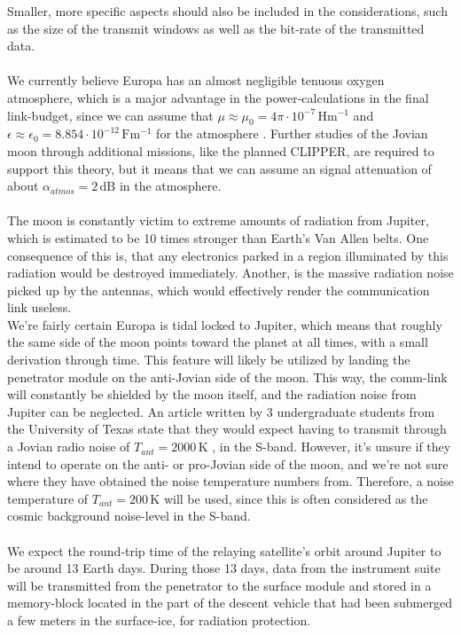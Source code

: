 Smaller, more specific aspects should also be included in the considerations, such as the size of the transmit windows as well as the bit-rate of the transmitted data.\\
\\
We currently believe Europa has an almost negligible tenuous oxygen atmosphere, which is a major advantage in the power-calculations in the final link-budget, since we can assume that $\mu\approx\mu_0=4\pi\cdot 10^{-7}\,\mathrm{Hm^{-1}}$ and $\epsilon\approx\epsilon_0=8.854\cdot 10^{-12} \,\mathrm{Fm^{-1}}$ for the atmosphere \cite{SciStrat}. Further studies of the Jovian moon through additional missions, like the planned CLIPPER, are required to support this theory, but it means that we can assume an signal attenuation of about $\alpha_{atmos}=2\,\mathrm{dB}$ in the atmosphere.\\
\\
The moon is constantly victim to extreme amounts of radiation from Jupiter, which is estimated to be 10 times stronger than Earth's Van Allen belts. One consequence of this is, that any electronics parked in a region illuminated by this radiation would be destroyed immediately. Another, is the massive radiation noise picked up by the antennas, which would effectively render the communication link useless.\\ 
We're fairly certain Europa is tidal locked to Jupiter, which means that roughly the same side of the moon points toward the planet at all times, with a small derivation through time. This feature will likely be utilized by landing the penetrator module on the anti-Jovian side of the moon. This way, the comm-link will constantly be shielded by the moon itself, and the radiation noise from Jupiter can be neglected. An article written by 3 undergraduate students from the University of Texas state that they would expect having to transmit through a Jovian radio noise of $T_{ant}=2000\,\mathrm{K}$ \cite{DORRA}, in the S-band. However, it's unsure if they intend to operate on the anti- or pro-Jovian side of the moon, and we're not sure where they have obtained the noise temperature numbers from. Therefore, a noise temperature of $T_{ant}=200\,\mathrm{K}$ will be used, since this is often considered as the cosmic background noise-level in the S-band.\\
\\
We expect the round-trip time of the relaying satellite's orbit around Jupiter to be around 13 Earth days. During those 13 days, data from the instrument suite will be transmitted from the penetrator to the surface module and stored in a memory-block located in the part of the descent vehicle that had been submerged a few meters in the surface-ice, for radiation protection.\\
